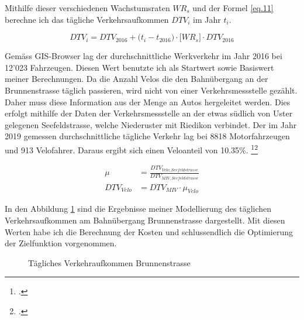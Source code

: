 Mithilfe dieser verschiedenen Wachstumsraten $WR_{s}$ und der Formel \ref{eq.11} berechne ich das tägliche Verkehrsaufkommen $DTV_{i}$ im Jahr $t_{i}$.

\begin{equation*}
DTV_{i} = DTV_{2016} + \bigl( t_{i} - t_{2016} \bigr) \cdot \bigl[WR_{s}\bigr] \cdot DTV_{2016}
\label{eq.11}
\end{equation*}

Gemäss GIS-Browser lag der durchschnittliche Werkverkehr im Jahr 2016 bei 12'023 Fahrzeugen. Diesen Wert benutzte ich als Startwert sowie Basiswert meiner Berechnungen.
Da die Anzahl Velos die den Bahnübergang an der Brunnenstrasse täglich passieren, wird nicht von einer Verkehrsmessstelle gezählt. Daher muss diese Information aus der Menge an Autos hergeleitet werden. Dies erfolgt mithilfe der Daten der Verkehrsmessstelle an der etwas südlich von Uster gelegenen Seefeldstrasse, welche Niederuster mit Riedikon verbindet. 
Der im Jahr 2019 gemessen durchschnittliche tägliche Verkehr lag bei 8818 Motorfahrzeugen und 913 Velofahrer. Daraus ergibt sich einen Veloanteil von 10.35\%. \footcite{MIVSeefeld}\footcite{VeloSeefeld}

\begin{align*}
\mu &= \frac{DTV_{Velo,Seefeldstrasse}}{DTV_{MIV,Seefeldstrasse}}   \\
DTV_{Velo} &= DTV_{MIV} \cdot \mu_{Velo} 
\end{align*}

In den Abbildung \ref{fig:DTV} sind die Ergebnisse meiner Modellierung des täglichen Verkehrsaufkommen am Bahnübergang Brunnenstrasse dargestellt. Mit diesen Werten habe ich die Berechnung der Kosten und schlussendlich die Optimierung der Zielfunktion vorgenommen.

\begin{figure}[h!]
  \centering
  \hfill
\caption[Verkehrsaufkommen]{Tägliches Verkehraufkommen Brunnenstrasse}
  \label{fig:DTV}
\end{figure}


